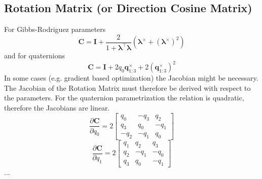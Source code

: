 \subsection{Rotation Matrix (or Direction Cosine Matrix)}
For Gibbs-Rodriguez parameters
\begin{equation}
\mathbf{C} = \mathbf{I} + \frac{2}{1+\boldsymbol{\lambda}^\top \boldsymbol{\lambda}}
\left(\boldsymbol{\lambda}^\times + \left(\boldsymbol{\lambda}^\times\right)^2\right)
\end{equation}
and for quaternions
\begin{equation}
\mathbf{C} = \mathbf{I} + 2 q_0 \mathbf{q}_{1:3}^\times + 2 \left(\mathbf{q}_{1:3}^\times\right)^2
\end{equation}
In some cases (e.g. gradient based optimization) the Jacobian might be necessary. The Jacobian of the Rotation Matrix must therefore be derived with respect to the parameters. For the quaternion parametrization the relation is quadratic, therefore the Jacobians are linear.
\begin{equation}
\frac{\partial \mathbf{C}}{\partial q_0} = 2 \left[ 
\begin{array}{ccc}
 q_0 & -q_3 &  q_2 \\
 q_3 &  q_0 & -q_1 \\
-q_2 & -q_1 &  q_0
\end{array} \right]
\end{equation}
\begin{equation}
\frac{\partial \mathbf{C}}{\partial q_1} = 2 \left[ 
\begin{array}{ccc}
q_1 & q_2 &   q_3 \\
q_2 & -q_1 & -q_0 \\
q_3 & q_0 &  -q_1
\end{array} \right]
\end{equation}
...

